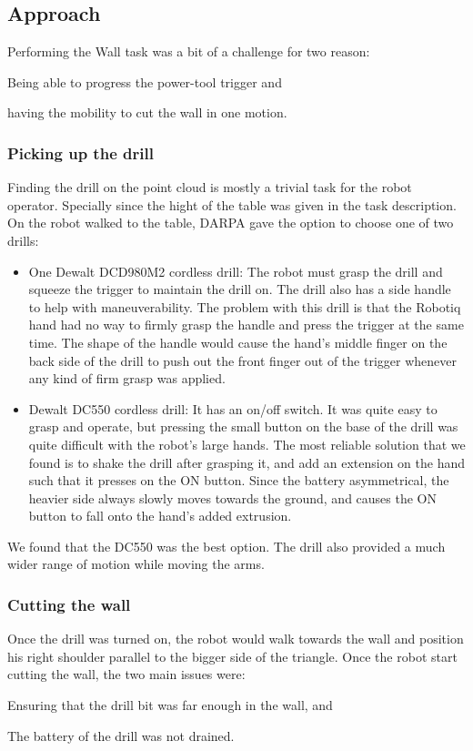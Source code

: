 \documentclass[12pt]{report}
\begin{document}
\subsection{Approach}
Performing the Wall task was a bit of a challenge for two reason: \begin{inparaenum}
\item Being able to progress the power-tool trigger and 
\item having the mobility to cut the wall in one motion. \end{inparaenum} 

\subsubsection{Picking up the drill}
Finding the drill on the point cloud is mostly a trivial task for the robot operator. Specially since the hight of the table was given in the task description. On the robot walked to the table, DARPA gave the option to choose one of two drills:

\begin{itemize}
\item One Dewalt DCD980M2 cordless drill: The robot must grasp the drill and squeeze the trigger to maintain the drill on. The drill also has a side handle to help with maneuverability. The problem with this drill is that the Robotiq hand had no way to firmly grasp the handle and press the trigger at the same time. The shape of the handle would cause the hand's middle finger on the back side of the drill to push out the front finger out of the trigger whenever any kind of firm grasp was applied. 

\item Dewalt DC550 cordless drill: It has an on/off switch. It was quite easy to grasp and operate, but pressing the small button on the base of the drill was quite difficult with the robot's large hands. The most reliable solution that we found is to shake the drill after grasping it, and add an extension on the hand such that it presses on the ON button.  Since the battery asymmetrical, the heavier side always slowly moves towards the ground, and causes the ON button to fall onto the hand's added extrusion. 
\end{itemize}

We found that the DC550 was the best option. The drill also provided a much wider range of motion while moving the arms. 

\subsubsection{Cutting the wall}
Once the drill was turned on, the robot would walk towards the wall and position his right shoulder parallel to the bigger side of the triangle. Once the robot start cutting the wall, the two main issues were:  \begin{inparaenum}
\item Ensuring that the drill bit was far enough in the wall, and  
\item The battery of the drill was not drained. \end{inparaenum} 
\end{document}
